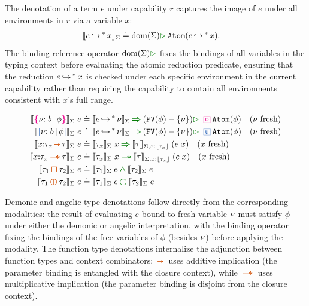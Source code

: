 The denotation of a term $e$ under capability $r$ captures the image
of $e$ under all environments in $r$ via a variable $x$:
\vspace{-0.2em}
\begin{align*}
  \denot{\mstep{e}{x}}_\Sigma &\doteq \forallM{\Dom{\Sigma}}\,\Code{Atom}(\mstep{e}{x}).
\end{align*}
The binding reference operator $\forallM{\Dom{\Sigma}}$ fixes the
bindings of all variables in the typing context before evaluating the
atomic reduction predicate, ensuring that the reduction ${e}{{\,\hookrightarrow\,}^*\,}{x}$
is checked under each specific environment in the current capability
rather than requiring the capability to contain all environments
consistent with $x$'s full range.

\begin{definition}\label{def:type-denotation}
  \vspace{-0.2em}
  \begin{align*}
    \denot{\ort{b}{\phi}}_\Sigma\;e &\doteq \denot{\mstep{e}{\vnu}}_\Sigma \chimpl \forallM{(\Code{FV}(\phi)-\{\vnu\})}\,\demonic\,\Code{Atom}(\phi) \quad \text{($\vnu$ fresh)}  \\
    \denot{\urt{b}{\phi}}_\Sigma\;e &\doteq \denot{\mstep{e}{\vnu}}_\Sigma \chimpl \forallM{(\Code{FV}(\phi)-\{\vnu\})}\,\angelic\,\Code{Atom}(\phi) \quad \text{($\vnu$ fresh)}  \\
    \denot{x{:}\tau_x \ctsarr \tau}_\Sigma\;e &\doteq \denot{\tau_x}_\Sigma\;x \chimpl \denot{\tau}_{\Sigma,x{:}\eraserf{\tau_x}}\;(e\;x) \quad \text{($x$ fresh)}  \\
    \denot{x{:}\tau_x \ctwand \tau}_\Sigma\;e &\doteq \denot{\tau_x}_\Sigma\;x \chwand \denot{\tau}_{\Sigma,x{:}\eraserf{\tau_x}}\;(e\;x) \quad \text{($x$ fresh)}  \\
    \denot{\tau_1 \ctinter \tau_2}_\Sigma\;e &\doteq \denot{\tau_1}_\Sigma\;e \chland \denot{\tau_2}_\Sigma\;e  \\
    \denot{\tau_1 \ctoplus \tau_2}_\Sigma\;e &\doteq \denot{\tau_1}_\Sigma\;e \choplus \denot{\tau_2}_\Sigma\;e
  \end{align*}
\end{definition}

Demonic and angelic type denotations follow directly from the
corresponding modalities: the result of evaluating $e$ bound to
fresh variable $\nu$ must satisfy $\phi$ under either the demonic or
angelic interpretation, with the binding operator fixing the bindings
of the free variables of $\phi$ (besides $\nu$) before applying the modality.  The
function type denotations internalize the adjunction between function
types and context combinators: $\ctsarr$ uses additive implication
(the parameter binding is entangled with the closure context), while
$\ctwand$ uses multiplicative implication (the parameter binding is
disjoint from the closure context).

